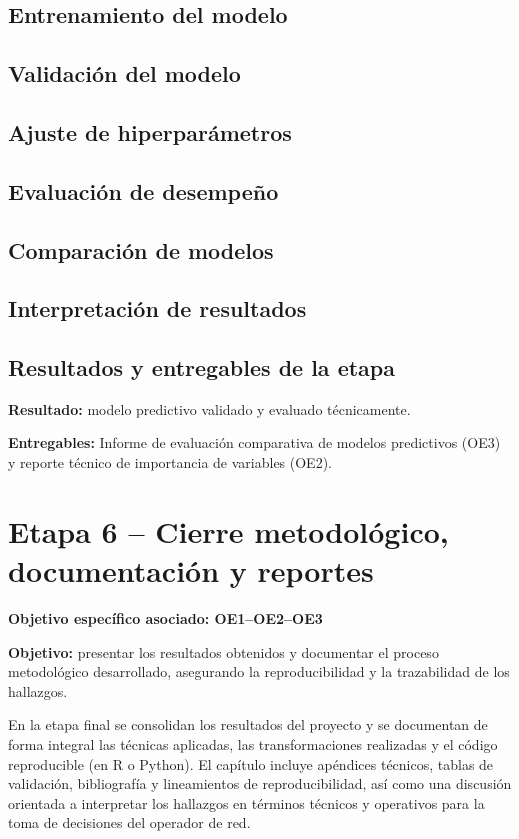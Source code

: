 \subsection{Entrenamiento del modelo}

\subsection{Validación del modelo}

\subsection{Ajuste de hiperparámetros}

\subsection{Evaluación de desempeño}

\subsection{Comparación de modelos}

\subsection{Interpretación de resultados}

\subsection{Resultados y entregables de la etapa}

\textbf{Resultado:} modelo predictivo validado y evaluado técnicamente.

\textbf{Entregables:} Informe de evaluación comparativa de modelos predictivos (OE3) y reporte técnico de importancia de variables (OE2).


\section{Etapa 6 – Cierre metodológico, documentación y reportes}

\textbf{Objetivo específico asociado: OE1–OE2–OE3}

\textbf{Objetivo:} presentar los resultados obtenidos y documentar el proceso metodológico desarrollado, asegurando la reproducibilidad y la trazabilidad de los hallazgos.

En la etapa final se consolidan los resultados del proyecto y se documentan de forma integral las técnicas aplicadas, las transformaciones realizadas y el código reproducible (en R o Python). El capítulo incluye apéndices técnicos, tablas de validación, bibliografía y lineamientos de reproducibilidad, así como una discusión orientada a interpretar los hallazgos en términos técnicos y operativos para la toma de decisiones del operador de red.

